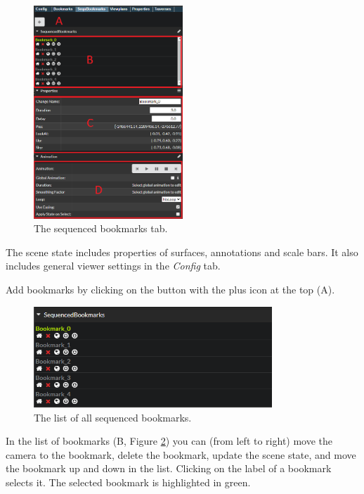 \begin{figure}[h]
	\centering
	\includegraphics[width=0.5\textwidth]{pics/SequencedBookmarks_tabUpper.PNG}
	\caption[Viewer Features Bookmarks]{The sequenced bookmarks tab.}
	\label{fig:seqBookmarks}
\end{figure}

The scene state includes properties of surfaces, annotations and scale bars. It also includes general viewer settings in the \emph{Config} tab. 

Add bookmarks by clicking on the button with the plus icon at the top (A).

\begin{figure}[h]
	\centering
	\includegraphics[width=0.8\textwidth]{pics/SequencedBookmarks_list.png}
	\caption[Viewer Features Bookmarks]{The list of all sequenced bookmarks.}
	\label{fig:seqBookmarks_list}
\end{figure}

In the list of bookmarks (B, Figure \ref{fig:seqBookmarks_list}) you can (from left to right) move the camera to the bookmark, delete the bookmark, update the scene state, and move the bookmark up and down in the list. Clicking on the label of a bookmark selects it. The selected bookmark is highlighted in green.

